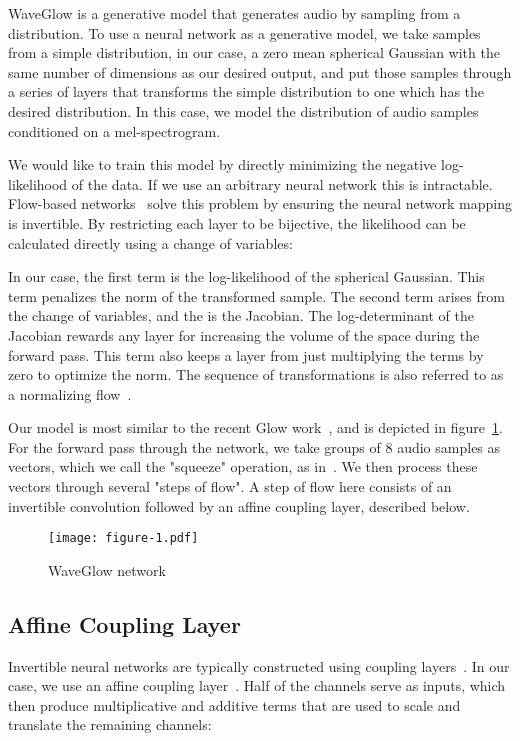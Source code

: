 WaveGlow is a generative model that generates audio by sampling from a distribution. To use a neural network as a generative model, we take samples from a simple distribution, in our case, a zero mean spherical Gaussian with the same number of dimensions as our desired output, and put those samples through a series of layers that transforms the simple distribution to one which has the desired distribution. In this case, we model the distribution of audio samples conditioned on a mel-spectrogram. 



We would like to train this model by directly minimizing the negative log-likelihood of the data. If we use an arbitrary neural network this is intractable.  Flow-based networks~\cite{dinh2014nice,dinh2016density,kingma2018glow} solve this problem by ensuring the neural network mapping is invertible.  By restricting each layer to be bijective, the likelihood can be calculated directly using a change of variables:



In our case, the first term is the log-likelihood of the spherical Gaussian.  This term penalizes the  norm of the transformed sample.  The second term arises from the change of variables, and the  is the Jacobian. The log-determinant of the Jacobian rewards any layer for increasing the volume of the space during the forward pass.  This term also keeps a layer from just multiplying the  terms by zero to optimize the  norm.  The sequence of transformations is also referred to as a normalizing flow~\cite{rezende2015variational}.

Our model is most similar to the recent Glow work~\cite{kingma2018glow}, and is depicted in figure~\ref{fig:network_diagram}. For the forward pass through the network, we take groups of 8 audio samples as vectors, which we call the "squeeze" operation, as in~\cite{kingma2018glow}. We then process these vectors through several "steps of flow". A step of flow here consists of an invertible  convolution followed by an affine coupling layer, described below.

\begin{figure}[!ht]
    \centering
    \texttt{[image: figure-1.pdf]}
    \caption{WaveGlow network}
    \label{fig:network_diagram}
\end{figure}
\subsection{Affine Coupling Layer}
Invertible neural networks are typically constructed using coupling layers~\cite{dinh2014nice, dinh2016density, kingma2018glow}.  In our case, we use an affine coupling layer~\cite{dinh2016density}.  Half of the channels serve as inputs, which then produce multiplicative and additive terms that are used to scale and translate the remaining channels:  



